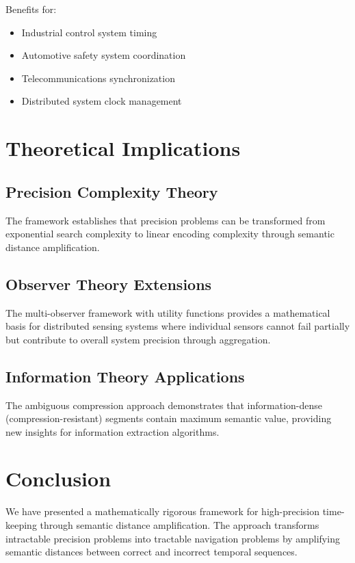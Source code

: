 \documentclass[12pt,a4paper]{article}
\begin{document}
Benefits for:
\begin{itemize}
\item Industrial control system timing
\item Automotive safety system coordination
\item Telecommunications synchronization
\item Distributed system clock management
\end{itemize}

\section{Theoretical Implications}

\subsection{Precision Complexity Theory}

The framework establishes that precision problems can be transformed from exponential search complexity to linear encoding complexity through semantic distance amplification.

\subsection{Observer Theory Extensions}

The multi-observer framework with utility functions provides a mathematical basis for distributed sensing systems where individual sensors cannot fail partially but contribute to overall system precision through aggregation.

\subsection{Information Theory Applications}

The ambiguous compression approach demonstrates that information-dense (compression-resistant) segments contain maximum semantic value, providing new insights for information extraction algorithms.

\section{Conclusion}

We have presented a mathematically rigorous framework for high-precision time-keeping through semantic distance amplification. The approach transforms intractable precision problems into tractable navigation problems by amplifying semantic distances between correct and incorrect temporal sequences.
\end{document}
